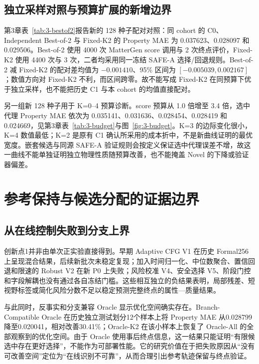 \subsection{独立采样对照与预算扩展的新增边界}

第3章表~\ref{tab:3-bestof2}报告新的 128 种子配对对照：同 cohort 的 C0、Independent Best-of-2 与 Fixed-K2 的 Property MAE 为 0.037623、0.028097 和 0.029506。Best-of-2 使用 4000 次 MatterGen score 调用与 2 次终点评价，Fixed-K2 使用 4400 次与 3 次，二者均采用同一冻结 SAFE-A 选择/回退规则。Best-of-2 减 Fixed-K2 的配对差均值为 $-0.001410$、95\% 区间为 $[-0.005039,0.002167]$；数值方向对 Fixed-K2 不利，而区间跨零。故不能写成 Fixed-K2 在同预算下优于独立采样，也不能把历史 C1 与本 cohort 的均值直接配对。

另一组新 128 种子用于 K=0--4 预算诊断。score 预算从 1.0 倍增至 3.4 倍，选中代理 Property MAE 依次为 0.035141、0.031636、0.028454、0.028419 和 0.024669，见第3章表~\ref{tab:3-budget}与图~\ref{fig:3-budget}。K=3 的边际变化很小，K=4 数值最低；K=2 是原有 C1 确认所采用的成本折中，不是新曲线证明的最优宽度。嵌套候选与同源 SAFE-A 验证规则会按定义保证选中代理误差不增，故这一曲线不能单独证明独立物理性质随预算改善，也不能掩盖 Novel 的下降或验证器偏差。

\section{参考保持与候选分配的证据边界}

\subsection{从在线控制失败到分支上界}

创新点1并非由单次正实验直接得到。早期 Adaptive CFG V1 在历史 Formal256 上呈现混合结果，后续新批次未稳定复现；加入时间归一化、中位数聚合、置信回退和限速的 Robust V2 在新 P0 上失败；风险校准 V4、安全选择 V5、阶段门控和字段解耦也没有通过各自冻结门槛。这些相互独立的负结果表明，局部残差、短视野标签或简化风险分数不足以稳定预测完整终点的属性---质量结果。

与此同时，反事实和分支兼容 Oracle 显示优化空间确实存在。Branch-Compatible Oracle 在历史独立测试划分12个样本上将 Property MAE 从0.028799降至0.020041，相对改善30.41\%；Oracle-K2 在该小样本上恢复了 Oracle-All 的全部观察到的优化空间。由于 Oracle 使用事后终点信息，这一结果只能证明``有限候选中存在更好选择''，不能作为可部署性能。它的研究价值在于把失败原因从``没有可改善空间''定位为``在线识别不可靠''，从而合理引出参考轨迹保留与终点验证。

